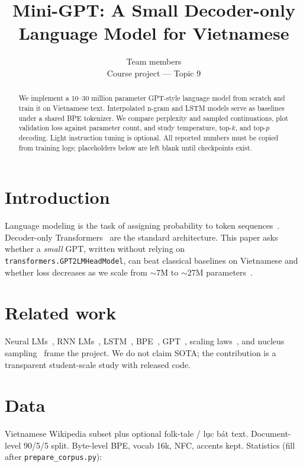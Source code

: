\documentclass[11pt]{article}
\title{Mini-GPT: A Small Decoder-only Language Model for Vietnamese}
\author{Team members \\
  Course project --- Topic 9}
\begin{document}
\maketitle

\begin{abstract}
We implement a 10--30 million parameter GPT-style language model from scratch and train it on Vietnamese text. Interpolated n-gram and LSTM models serve as baselines under a shared BPE tokenizer. We compare perplexity and sampled continuations, plot validation loss against parameter count, and study temperature, top-$k$, and top-$p$ decoding. Light instruction tuning is optional. All reported numbers must be copied from training logs; placeholders below are left blank until checkpoints exist.
\end{abstract}

\section{Introduction}

Language modeling is the task of assigning probability to token sequences~\cite{jurafsky2023slp}. Decoder-only Transformers~\cite{vaswani2017attention,radford2018improving,radford2019language} are the standard architecture. This paper asks whether a \emph{small} GPT, written without relying on \texttt{transformers.GPT2LMHeadModel}, can beat classical baselines on Vietnamese and whether loss decreases as we scale from $\sim$7M to $\sim$27M parameters~\cite{kaplan2020scaling}.

\section{Related work}

Neural LMs~\cite{bengio2003neural}, RNN LMs~\cite{mikolov2010recurrent}, LSTM~\cite{hochreiter1997lstm}, BPE~\cite{sennrich2016neural}, GPT~\cite{radford2018improving,radford2019language}, scaling laws~\cite{kaplan2020scaling}, and nucleus sampling~\cite{holtzman2020curious} frame the project. We do not claim SOTA; the contribution is a transparent student-scale study with released code.

\section{Data}

Vietnamese Wikipedia subset plus optional folk-tale / lục bát text. Document-level 90/5/5 split. Byte-level BPE, vocab 16k, NFC, accents kept. Statistics (fill after \texttt{prepare\_corpus.py}):
\end{document}
